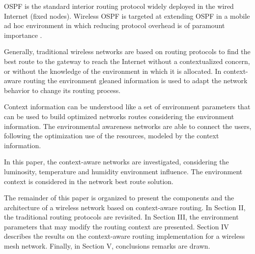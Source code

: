 OSPF is the standard interior routing protocol widely deployed in the wired Internet (fixed nodes). Wireless OSPF is targeted at extending OSPF in a mobile ad hoc environment in which reducing protocol overhead is of paramount importance \cite{Holter2010}.

Generally, traditional wireless networks are based on routing protocols to find the best route to the gateway to reach the Internet without a contextualized concern, or without the knowledge of the environment in which it is allocated. In context-aware routing the environment gleaned information is used to adapt the network behavior to change its routing process.

Context information can be understood like a set of environment parameters that can be used to build optimized networks routes considering the environment information. The environmental awareness networks are able to connect the users, following the optimization use of the resources, modeled by the context information.

In this paper, the context-aware networks are investigated, considering the luminosity, temperature and humidity environment influence. The environment context is considered in the network best route solution.

The remainder of this paper is organized to present the components and the architecture of a wireless network based on context-aware routing. In Section II, the traditional routing protocols are revisited. In Section III, the environment parameters that may modify the routing context are presented. Section IV describes the results on the context-aware routing implementation for a wireless mesh network. Finally, in Section V, conclusions remarks are drawn.